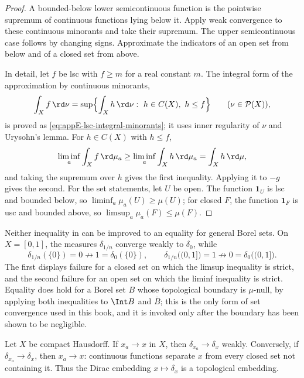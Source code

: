 \begin{proof}
A bounded-below lower semicontinuous function is the pointwise supremum of
continuous functions lying below it.  Apply weak convergence to these
continuous minorants and take their supremum.  The upper semicontinuous case
follows by changing signs.  Approximate the indicators of an open set from
below and of a closed set from above.

In detail, let $f$ be lsc with $f\geq m$ for a real constant $m$.  The
integral form of the approximation by continuous minorants,
\[
 \int_Xf\,\rd\nu=\sup\Bigl\{\int_Xh\,\rd\nu:\ h\in C(X),\ h\leq f\Bigr\}
 \qquad(\nu\in\mathcal P(X)),
\]
is proved as \eqref{eq:appE-lsc-integral-minorants}; it uses inner regularity
of $\nu$ and Urysohn's lemma.  For $h\in C(X)$ with $h\leq f$,
\[
 \liminf_a\int_Xf\,\rd\mu_a\geq\liminf_a\int_Xh\,\rd\mu_a
 =\int_Xh\,\rd\mu,
\]
and taking the supremum over $h$ gives the first inequality.  Applying it to
$-g$ gives the second.  For the set statements, let $U$ be open.  The function
$\mathbf 1_U$ is lsc and bounded below, so
$\liminf_a\mu_a(U)\geq\mu(U)$; for closed $F$, the function
$\mathbf 1_F$ is usc and bounded above, so
$\limsup_a\mu_a(F)\leq\mu(F)$.
\end{proof}

\begin{remark}
\label{rem:portmanteau-sharp}
Neither inequality in  can be improved to an equality
for general Borel sets.  On $X=[0,1]$, the measures $\delta_{1/n}$ converge
weakly to $\delta_0$, while
\[
 \delta_{1/n}(\{0\})=0\not\to1=\delta_0(\{0\}),
 \qquad
 \delta_{1/n}\bigl((0,1]\bigr)=1\not\to0=\delta_0\bigl((0,1]\bigr).
\]
The first displays failure for a closed set on which the limsup inequality is
strict, and the second failure for an open set on which the liminf inequality
is strict.  Equality does hold for a Borel set $B$ whose topological boundary
is $\mu$-null, by applying both inequalities to $\Int B$ and $\overline B$;
this is the only form of set convergence used in this book, and it is invoked
only after the boundary has been shown to be negligible.
\end{remark}

\begin{example}
\label{ex:moving-atoms}
Let $X$ be compact Hausdorff.  If $x_a\to x$ in $X$, then
$\delta_{x_a}\to\delta_x$ weakly.  Conversely, if
$\delta_{x_a}\to\delta_x$, then $x_a\to x$:
continuous functions separate $x$ from every closed set not containing it.
Thus the Dirac embedding $x\mapsto\delta_x$ is a topological embedding.
\end{example}

